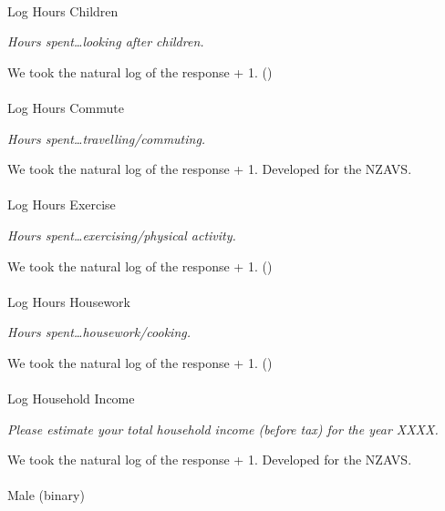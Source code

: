 \documentclass[
  single column]{article}
\makeatletter
\let\oldparagraph\paragraph
\renewcommand{\paragraph}{
    \@ifstar
      \xxxParagraphStar
      \xxxParagraphNoStar
  }
\newcommand{\xxxParagraphStar}[1]{\oldparagraph*{#1}\mbox{}}
\newcommand{\xxxParagraphNoStar}[1]{\oldparagraph{#1}\mbox{}}
\makeatother
\begin{document}
\paragraph{Log Hours Children}\label{log-hours-children}

\emph{Hours spent\ldots looking after children.}

We took the natural log of the response + 1.
()

\paragraph{Log Hours Commute}\label{log-hours-commute}

\emph{Hours spent\ldots travelling/commuting.}

We took the natural log of the response + 1. Developed for the NZAVS.

\paragraph{Log Hours Exercise}\label{log-hours-exercise}

\emph{Hours spent\ldots exercising/physical activity.}

We took the natural log of the response + 1.
()

\paragraph{Log Hours Housework}\label{log-hours-housework}

\emph{Hours spent\ldots housework/cooking.}

We took the natural log of the response + 1.
()

\paragraph{Log Household Income}\label{log-household-income}

\emph{Please estimate your total household income (before tax) for the
year XXXX.}

We took the natural log of the response + 1. Developed for the NZAVS.

\paragraph{Male (binary)}\label{male-binary}
\end{document}
